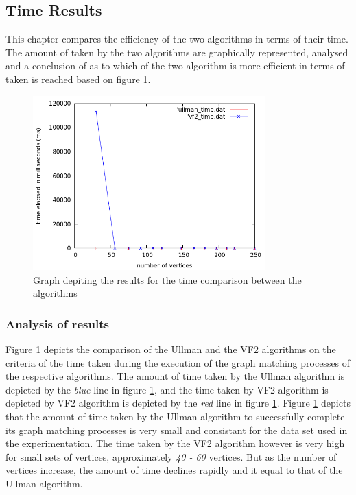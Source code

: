\subsection{Time Results}
\label{Time Results}
This chapter compares the efficiency of the two algorithms in terms of their time. The amount of taken by the two algorithms are graphically 
represented, analysed and a conclusion of as to which of the two algorithm is more efficient in terms of taken is reached based on figure \ref{fig:time_comparison}.
\begin{figure}[H]
  \begin{center}
      \includegraphics[width=0.8\textwidth]{time_comparison.png}
  \end{center}    
  \caption{Graph depiting the results for the time comparison between the algorithms}
  \label{fig:time_comparison}
\end{figure}

\subsubsection{Analysis of results}
Figure \ref{fig:time_comparison} depicts the comparison of the Ullman and the VF2 algorithms on the criteria of the time taken during the execution of the graph matching processes
of the respective algorithms.\newline\newline
The amount of time taken by the Ullman algorithm is depicted by the \textit{blue} line in figure \ref{fig:time_comparison}, and the time taken by VF2 algorithm 
is depicted by VF2 algorithm is depicted by the \textit{red} line in figure \ref{fig:time_comparison}.\newline\newline
Figure \ref{fig:time_comparison} depicts that the amount of time taken by the Ullman algorithm to successfully complete its graph matching processes is very 
small and consistant for the data set used in the experimentation.\newline\newline
The time taken by the VF2 algorithm however is very high for small sets of vertices, approximately \textit{40 - 60} vertices. But as the number of vertices 
increase, the amount of time declines rapidly and it equal to that of the Ullman algorithm.

